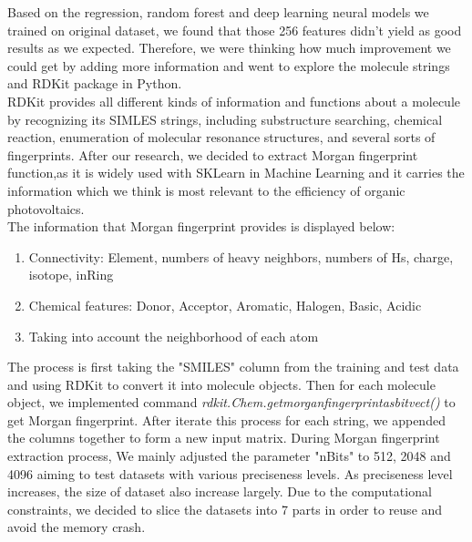 \documentclass[11pt]{article}
\begin{document}
\begin{enumerate}
Based on the regression, random forest and deep learning neural models we trained on original dataset, we found that those 256 features didn't yield as good results as we expected. Therefore, we were thinking how much improvement we could get by adding more information and went to explore the molecule strings and RDKit package in Python. \\

RDKit provides all different kinds of information and functions about a molecule by recognizing its SIMLES strings, including substructure searching, chemical reaction, enumeration of molecular resonance structures, and several sorts of fingerprints. After our research, we decided to extract Morgan fingerprint function,as it is widely used with SKLearn in Machine Learning and it carries the information which we think is most relevant to the efficiency of organic photovoltaics. \\ 

The information that Morgan fingerprint provides is displayed below:
\begin{enumerate}
\item Connectivity: Element, numbers of heavy neighbors, numbers of Hs, charge, isotope, inRing
\item Chemical features: Donor, Acceptor, Aromatic, Halogen, Basic, Acidic
\item Taking into account the neighborhood of each atom\\
\end{enumerate}
The process is first taking the "SMILES" column from the training and test data and using RDKit to convert it into molecule objects. Then for each molecule object, we implemented command {\itshape rdkit.Chem.getmorganfingerprintasbitvect()} to get Morgan fingerprint. After iterate this process for each string, we appended the columns together to form a new input matrix. During Morgan fingerprint extraction process, We mainly adjusted the parameter "nBits" to 512, 2048 and 4096 aiming to test datasets with various preciseness levels. As preciseness level increases, the size of dataset also increase largely. Due to the computational constraints, we decided to slice the datasets into 7 parts in order to reuse and avoid the memory crash. \\

\end{enumerate}
\end{document}
